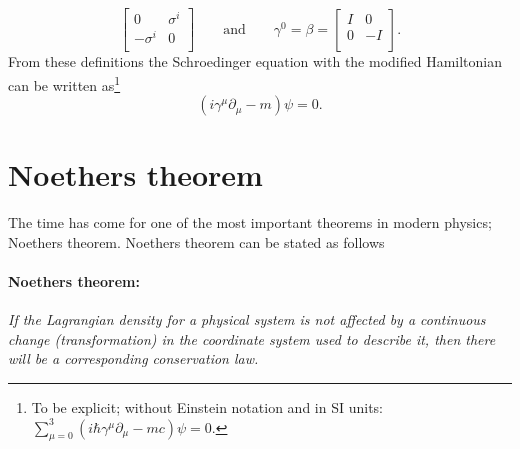 \begin{example}
\begin{equation}
\begin{bmatrix}
			0 & \sigma^{i}\\
			-\sigma^{i} & 0\\
		\end{bmatrix} \qquad \mbox{and} \qquad \gamma^{0}=\beta=\begin{bmatrix}
			I & 0\\
			0 & -I\\
		\end{bmatrix}.
	\end{equation} 
	From these definitions the Schroedinger equation with the modified Hamiltonian can be written as\footnote{To be explicit; without Einstein notation and in SI units: $\sum_{\mu=0}^{3}(i\hbar\gamma^{\mu}\partial_\mu-mc)\psi=0$.}
	\begin{equation}
		(i\gamma^{\mu}\partial_\mu-m)\psi=0.
	\end{equation} 
\end{example}

\section{Noethers theorem}
The time has come for one of the most important theorems in modern physics; Noethers theorem. Noethers theorem can be stated as follows
\paragraph{Noethers theorem:} \emph{If the Lagrangian density for a physical system is not affected by a continuous change (transformation) in the coordinate system used to describe it, then there will be a corresponding conservation law.}\newline

